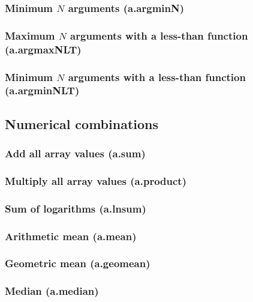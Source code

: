 \documentclass{article}
\theoremstyle{definition}
\begin{document}
\subsubsection{Minimum $N$ arguments (a.argminN)}

\subsubsection{Maximum $N$ arguments with a less-than function (a.argmaxNLT)}

\subsubsection{Minimum $N$ arguments with a less-than function (a.argminNLT)}

\subsection{Numerical combinations}

\subsubsection{Add all array values (a.sum)}

\subsubsection{Multiply all array values (a.product)}

\subsubsection{Sum of logarithms (a.lnsum)}

\subsubsection{Arithmetic mean (a.mean)}

\subsubsection{Geometric mean (a.geomean)}

\subsubsection{Median (a.median)}
\end{document}
